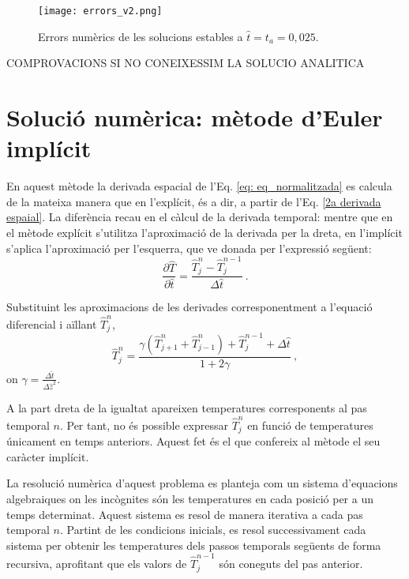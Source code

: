 \documentclass[11pt]{article}
\begin{document}
\begin{figure}[hbt!]
    \centering
    \texttt{[image: errors\_v2.png]}  
    \caption{Errors numèrics de les solucions estables a $\hat{t}=t_a=0,025$.}
    \label{fig: error_explicit}
\end{figure}

COMPROVACIONS SI NO CONEIXESSIM LA SOLUCIO ANALITICA

\section{Solució numèrica: mètode d'Euler implícit}
En aquest mètode la derivada espacial de l'Eq. \eqref{eq: eq_normalitzada} es calcula de la mateixa manera que en l'explícit, és a dir, a partir de l'Eq. \eqref{2a derivada espaial}. La diferència recau en el càlcul de la derivada temporal: mentre que en el mètode explícit s'utilitza l'aproximació de la derivada per la dreta, en l'implícit s'aplica l'aproximació per l'esquerra, que ve donada per l'expressió següent:
\begin{equation}
    \frac{\partial \hat{T}}{\partial \hat{t}} = \frac{\hat{T}_j^n - \hat{T}_j^{n-1}}{\Delta \hat{t}} \ .
    \label{derivada per lesquerra}
\end{equation}

Substituint les aproximacions de les derivades corresponentment a l'equació diferencial i aïllant $\hat{T}_j^n$,
\begin{equation}
    \hat{T}_j^n = \frac{\gamma \left( \hat{T}_{j+1}^n + \hat{T}_{j-1}^n \right) + \hat{T}_j^{n-1} + \Delta \hat{t}}{1 + 2\gamma}
    \label{Tnj implicit} \ ,
\end{equation}
on $\gamma =\frac{\Delta \hat{t}}{\Delta \hat{z}^2}$.

A la part dreta de la igualtat apareixen temperatures corresponents al pas temporal $n$. Per tant, no és possible expressar $\hat{T}_j^n$ en funció de temperatures únicament en temps anteriors. Aquest fet és el que confereix al mètode el seu caràcter implícit.

La resolució numèrica d'aquest problema es planteja com un sistema d'equacions algebraiques on les incògnites són les temperatures en cada posició per a un temps determinat. Aquest sistema es resol de manera iterativa a cada pas temporal $n$. Partint de les condicions inicials, es resol successivament cada sistema per obtenir les temperatures dels passos temporals següents de forma recursiva, aprofitant que els valors de $\hat{T}_j^{n-1}$ són coneguts del pas anterior.
\end{document}
